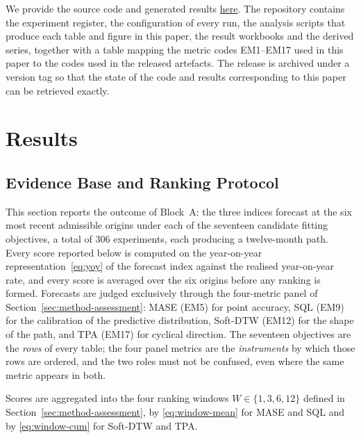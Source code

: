 \documentclass[12pt]{article}
\newcommand{\repobase}{https://github.com/madarasw/Automated_Ensemble_Forecasting_for_Inflation_Sri_Lanka}
\newcommand{\repolink}[1]{\href{\repobase}{#1}}
\begin{document}
We provide the source code and generated results \repolink{here}. The repository
contains the experiment register, the configuration of every run, the analysis
scripts that produce each table and figure in this paper, the result workbooks
and the derived series, together with a table mapping the metric codes
EM1--EM17 used in this paper to the codes used in the released artefacts. The release is archived under
a version tag so that the state of the code and results corresponding to this
paper can be retrieved exactly.


\section{Results}
\label{sec:results}

\subsection{Evidence Base and Ranking Protocol}
\label{sec:res-protocol}

This section reports the outcome of Block~A: the three indices forecast at the
six most recent admissible origins under each of the seventeen candidate
fitting objectives, a total of 306 experiments, each producing a twelve-month
path. Every score reported below is computed on the year-on-year
representation~\eqref{eq:yoy} of the forecast index against the realised
year-on-year rate, and every score is averaged over the six origins before any
ranking is formed. Forecasts are judged exclusively through the four-metric
panel of Section~\ref{sec:method-assessment}: MASE (EM5) for point accuracy,
SQL (EM9) for the calibration of the predictive distribution, Soft-DTW (EM12)
for the shape of the path, and TPA (EM17) for cyclical direction. The seventeen
objectives are the \emph{rows} of every table; the four panel metrics are the
\emph{instruments} by which those rows are ordered, and the two roles must not
be confused, even where the same metric appears in both.

Scores are aggregated into the four ranking windows
$W \in \{1,3,6,12\}$ defined in Section~\ref{sec:method-assessment}, by
\eqref{eq:window-mean} for MASE and SQL and by \eqref{eq:window-cum} for
Soft-DTW and TPA.
\end{document}
